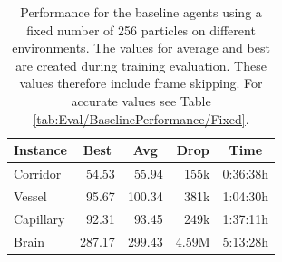\begin{table}[htp]
    \begin{center}
        \begin{tabular}{lrrrr}
            \toprule
            \multicolumn{1}{c}{Instance} & \multicolumn{1}{c}{Best} & \multicolumn{1}{c}{Avg} & \multicolumn{1}{c}{Drop} & \multicolumn{1}{c}{Time}\\
            \midrule
            Corridor & 54.53 & 55.94 & 155k  & 0:36:38h \\
            Vessel & 95.67 & 100.34 & 381k & 1:04:30h \\
            Capillary & 92.31 & 93.45 & 249k & 1:37:11h \\
            Brain & 287.17 & 299.43 & 4.59M & 5:13:28h \\
            \bottomrule
        \end{tabular}
    \end{center}
    \caption[Baseline Training Performance for Agents on Different Environments]{Performance for the baseline agents using a fixed number of 256 particles on different environments. The values for average and best are created during training evaluation. These values therefore include frame skipping. For accurate values see Table \ref{tab:Eval/BaselinePerformance/Fixed}.} \label{tab:Eval/BaselinePerformance/Training}
\end{table}


